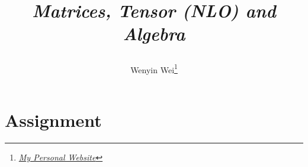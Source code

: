 \documentclass[10pt]{article}
\title{\begin{center}{\Huge \textit{Matrices, Tensor (NLO) and Algebra}}\end{center}}
\author{Wenyin Wei\footnote{\href{https://wenyin.xyz/}{\textit{My Personal Website}}}}
\affiliation{
Tsinghua University\\
Department of Engineering Physics
}
\begin{document}
	\maketitle
	\flushbottom
	\newpage
	\pagestyle{fancynotes}

	\section{Assignment}
	
\end{document}
